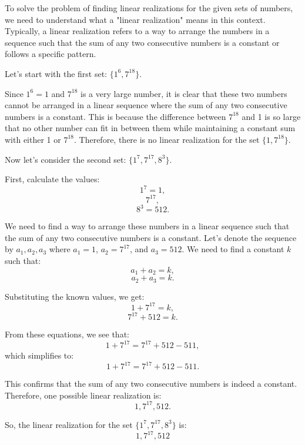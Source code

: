 To solve the problem of finding linear realizations for the given sets of numbers, we need to understand what a "linear realization" means in this context. Typically, a linear realization refers to a way to arrange the numbers in a sequence such that the sum of any two consecutive numbers is a constant or follows a specific pattern.

Let's start with the first set: \(\{1^6, 7^{18}\}\).

Since \(1^6 = 1\) and \(7^{18}\) is a very large number, it is clear that these two numbers cannot be arranged in a linear sequence where the sum of any two consecutive numbers is a constant. This is because the difference between \(7^{18}\) and 1 is so large that no other number can fit in between them while maintaining a constant sum with either 1 or \(7^{18}\). Therefore, there is no linear realization for the set \(\{1, 7^{18}\}\).

Now let's consider the second set: \(\{1^7, 7^{17}, 8^3\}\).

First, calculate the values:
\[1^7 = 1,\]
\[7^{17},\]
\[8^3 = 512.\]

We need to find a way to arrange these numbers in a linear sequence such that the sum of any two consecutive numbers is a constant. Let's denote the sequence by \(a_1, a_2, a_3\) where \(a_1 = 1\), \(a_2 = 7^{17}\), and \(a_3 = 512\). We need to find a constant \(k\) such that:
\[a_1 + a_2 = k,\]
\[a_2 + a_3 = k.\]

Substituting the known values, we get:
\[1 + 7^{17} = k,\]
\[7^{17} + 512 = k.\]

From these equations, we see that:
\[1 + 7^{17} = 7^{17} + 512 - 511,\]
which simplifies to:
\[1 + 7^{17} = 7^{17} + 512 - 511.\]

This confirms that the sum of any two consecutive numbers is indeed a constant. Therefore, one possible linear realization is:
\[1, 7^{17}, 512.\]

So, the linear realization for the set \(\{1^7, 7^{17}, 8^3\}\) is:
\[
\boxed{1, 7^{17}, 512}
\]